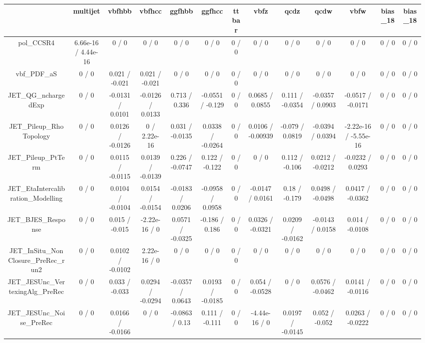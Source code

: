 \documentclass[10pt]{article}
\begin{document}
\begin{table}[htbp]
\begin{center}
\begin{tabular}{|c|c|c|c|c|c|c|c|c|c|c|c|c|}
\hline 
      & multijet      & vbfhbb      & vbfhcc      & ggfhbb      & ggfhcc      & ttbar      & vbfz      & qcdz      & qcdw      & vbfw      & bias_18      & bias_18 \\ 
\hline 
  pol_CCSR4 & 6.66e-16 / 4.44e-16 & 0 / 0 & 0 / 0 & 0 / 0 & 0 / 0 & 0 / 0 & 0 / 0 & 0 / 0 & 0 / 0 & 0 / 0 & 0 / 0 & 0 / 0 \\ 
  vbf_PDF_aS & 0 / 0 & 0.021 / -0.021 & 0.021 / -0.021 & 0 / 0 & 0 / 0 & 0 / 0 & 0 / 0 & 0 / 0 & 0 / 0 & 0 / 0 & 0 / 0 & 0 / 0 \\ 
  JET_QG_nchargedExp & 0 / 0 & -0.0131 / 0.0101 & -0.0126 / 0.0133 & 0.713 / 0.336 & -0.0551 / -0.129 & 0 / 0 & 0.0685 / 0.0855 & 0.111 / -0.0354 & -0.0357 / 0.0903 & -0.0517 / -0.0171 & 0 / 0 & 0 / 0 \\ 
  JET_Pileup_RhoTopology & 0 / 0 & 0.0126 / -0.0126 & 0 / 2.22e-16 & 0.031 / -0.0135 & 0.0338 / -0.0264 & 0 / 0 & 0.0106 / -0.00939 & -0.079 / 0.0819 & -0.0394 / 0.0394 & -2.22e-16 / -5.55e-16 & 0 / 0 & 0 / 0 \\ 
  JET_Pileup_PtTerm & 0 / 0 & 0.0115 / -0.0115 & 0.0139 / -0.0139 & 0.226 / -0.0747 & 0.122 / -0.122 & 0 / 0 & 0 / 0 & 0.112 / -0.106 & 0.0212 / -0.0212 & -0.0232 / 0.0293 & 0 / 0 & 0 / 0 \\ 
  JET_EtaIntercalibration_Modelling & 0 / 0 & 0.0104 / -0.0104 & 0.0154 / -0.0154 & -0.0183 / 0.0206 & -0.0958 / 0.0958 & 0 / 0 & -0.0147 / 0.0161 & 0.18 / -0.179 & 0.0498 / -0.0498 & 0.0417 / -0.0362 & 0 / 0 & 0 / 0 \\ 
  JET_BJES_Response & 0 / 0 & 0.015 / -0.015 & -2.22e-16 / 0 & 0.0571 / -0.0325 & -0.186 / 0.186 & 0 / 0 & 0.0326 / -0.0321 & 0.0209 / -0.0162 & -0.0143 / 0.0158 & 0.014 / -0.0108 & 0 / 0 & 0 / 0 \\ 
  JET_InSitu_NonClosure_PreRec_run2 & 0 / 0 & 0.0102 / -0.0102 & 2.22e-16 / 0 & 0 / 0 & 0 / 0 & 0 / 0 & 0 / 0 & 0 / 0 & 0 / 0 & 0 / 0 & 0 / 0 & 0 / 0 \\ 
  JET_JESUnc_VertexingAlg_PreRec & 0 / 0 & 0.033 / -0.033 & 0.0294 / -0.0294 & -0.0357 / 0.0643 & 0.0193 / -0.0185 & 0 / 0 & 0.054 / -0.0528 & 0 / 0 & 0.0576 / -0.0462 & 0.0141 / -0.0116 & 0 / 0 & 0 / 0 \\ 
  JET_JESUnc_Noise_PreRec & 0 / 0 & 0.0166 / -0.0166 & 0 / 0 & -0.0863 / 0.13 & 0.111 / -0.111 & 0 / 0 & -4.44e-16 / 0 & 0.0197 / -0.0145 & 0.052 / -0.052 & 0.0263 / -0.0222 & 0 / 0 & 0 / 0 \\ 

\end{tabular}
\end{center}
\end{table}
\end{document}
